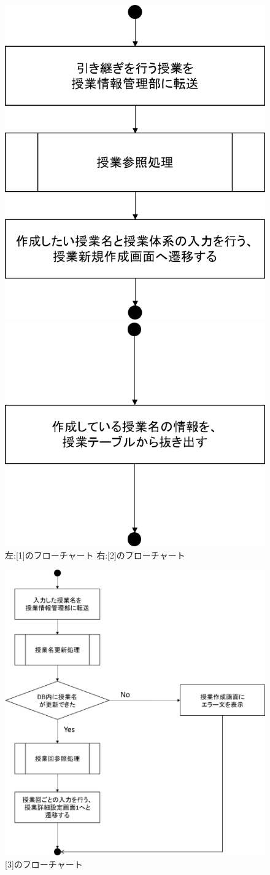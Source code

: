 \begin{figure}[htbp]
 \begin{minipage}{0.5\hsize}
  \begin{center}
   \includegraphics[width=0.45\linewidth,clip]{./img/takeover_lecture/sub1.png}
  \end{center}
 \end{minipage}
 \begin{minipage}{0.5\hsize}
  \begin{center}
   \includegraphics[width=0.45\linewidth,clip]{./img/takeover_lecture/sub2.png}
  \end{center}
 \end{minipage}
 \caption{左:[1]のフローチャート 右:[2]のフローチャート}\label{fig:takeoverlectureflow0}
\end{figure}


\begin{figure}[htbp]
  \begin{center}
    \includegraphics[width=0.5\linewidth,clip]{./img/takeover_lecture/sub3.png}
    \caption{[3]のフローチャート}\label{fig:takeoverflow1.1}
  \end{center}
\end{figure}

